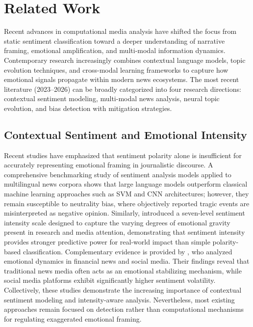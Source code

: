 \documentclass[final,1p,times]{elsarticle}
\begin{document}
\section{Related Work}

Recent advances in computational media analysis have shifted the focus from static sentiment classification toward a deeper understanding of narrative framing, emotional amplification, and multi-modal information dynamics. Contemporary research increasingly combines contextual language models, topic evolution techniques, and cross-modal learning frameworks to capture how emotional signals propagate within modern news ecosystems. The most recent literature (2023–2026) can be broadly categorized into four research directions: contextual sentiment modeling, multi-modal news analysis, neural topic evolution, and bias detection with mitigation strategies.

\subsection{Contextual Sentiment and Emotional Intensity}

Recent studies have emphasized that sentiment polarity alone is insufficient for accurately representing emotional framing in journalistic discourse. A comprehensive benchmarking study of sentiment analysis models applied to multilingual news corpora \cite{zanoli2025benchmarking} shows that large language models outperform classical machine learning approaches such as SVM and CNN architectures; however, they remain susceptible to neutrality bias, where objectively reported tragic events are misinterpreted as negative opinion. Similarly, \cite{areia2025sentiment} introduced a seven-level sentiment intensity scale designed to capture the varying degrees of emotional gravity present in research and media attention, demonstrating that sentiment intensity provides stronger predictive power for real-world impact than simple polarity-based classification. Complementary evidence is provided by \cite{kim2025news}, who analyzed emotional dynamics in financial news and social media. Their findings reveal that traditional news media often acts as an emotional stabilizing mechanism, while social media platforms exhibit significantly higher sentiment volatility. Collectively, these studies demonstrate the increasing importance of contextual sentiment modeling and intensity-aware analysis. Nevertheless, most existing approaches remain focused on detection rather than computational mechanisms for regulating exaggerated emotional framing.
\end{document}
